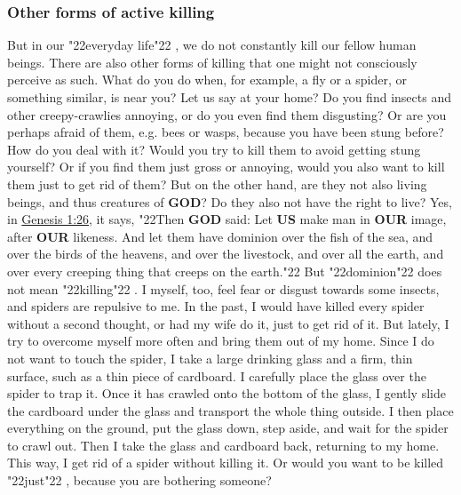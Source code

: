 \documentclass[12pt,a5paper]{article}
\newcommand{\God}[0]{\textbf{GOD}}
\newcommand{\Our}[0]{\textbf{OUR}}
\newcommand{\Us}[0]{\textbf{US}}
\newcommand{\q}[1]{\char"22{#1}\char"22 }
\begin{document}
	\subsubsection{Other forms of active killing}
		But in our \q{everyday life},
		we do not constantly kill our fellow human beings.
		There are also other forms of killing that one might not consciously perceive as such.
		What do you do when,
		for example,
		a fly or a spider,
		or something similar,
		is near you?
		Let us say at your home?
		Do you find insects and other creepy-crawlies annoying,
		or do you even find them disgusting?
		Or are you perhaps afraid of them,
		e.g. bees or wasps,
		because you have been stung before?
		How do you deal with it?
		Would you try to kill them to avoid getting stung yourself?
		Or if you find them just gross or annoying,
		would you also want to kill them just to get rid of them?
		But on the other hand,
		are they not also living beings,
		and thus creatures of {\God}?
		Do they also not have the right to live?
		Yes, in \href{https://www.die-bibel.de/bibeln/online-bibeln/lesen/ESV/GEN.1/Genesis-1}{Genesis 1:26},
		it says, 
		\q{Then {\God} said:
		Let {\Us} make man in {\Our} image,
		after {\Our} likeness.
		And let them have dominion over the fish of the sea,
		and over the birds of the heavens,
		and over the livestock,
		and over all the earth,
		and over every creeping thing that creeps on the earth.}
		But \q{dominion} does not mean \q{killing}.
		I myself,
		too,
		feel fear or disgust towards some insects,
		and spiders are repulsive to me.
		In the past,
		I would have killed every spider without a second thought,
		or had my wife do it,
		just to get rid of it.
		But lately,
		I try to overcome myself more often and bring them out of my home.
		Since I do not want to touch the spider,
		I take a large drinking glass and a firm,
		thin surface,
		such as a thin piece of cardboard.
		I carefully place the glass over the spider to trap it.
		Once it has crawled onto the bottom of the glass,
		I gently slide the cardboard under the glass and transport the whole thing outside.
		I then place everything on the ground,
		put the glass down,
		step aside,
		and wait for the spider to crawl out.
		Then I take the glass and cardboard back,
		returning to my home.
		This way,
		I get rid of a spider without killing it.
		Or would you want to be killed \q{just},
		because you are bothering someone?
\end{document}
